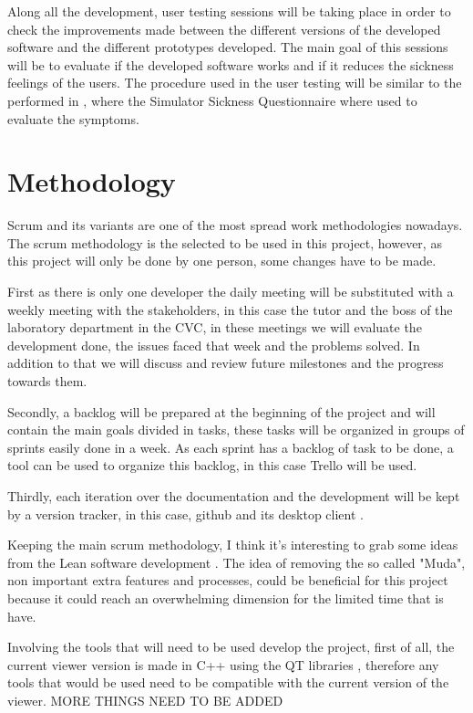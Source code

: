 \documentclass[10pt,a4paper,twocolumn,twoside]{article}
\begin{document}
Along all the development, user testing sessions will be taking place in order to check the improvements made between the different versions of the developed software and the different prototypes developed. The main goal of this sessions will be to evaluate if the developed software works and if it reduces the sickness feelings of the users. The procedure used in the user testing will be similar to the performed in \cite{ifftConfortDoF}, where the Simulator Sickness Questionnaire \cite{ssqQuestion} where used to evaluate the symptoms. 

\section{Methodology}
Scrum and its variants are one of the most spread work methodologies nowadays.
The scrum methodology is the selected to be used in this project, however, as this project will only be done by one person, some changes have to be made. 

First as there is only one developer the daily meeting will be substituted with a weekly meeting with the stakeholders, in this case the tutor and the boss of the laboratory department in the CVC, in these meetings we will evaluate the development done, the issues faced that week and the problems solved. In addition to that we will discuss and review future milestones and the progress towards them.

Secondly, a backlog will be prepared at the beginning of the project and will contain the main goals divided in tasks, these tasks will be organized in groups of sprints easily done in a week. As each sprint has a backlog of task to be done, a tool can be used to organize this backlog, in this case Trello\cite{web:trello} will be used.

Thirdly, each iteration over the documentation and the development will be kept by a version tracker, in this case, github \cite{web:github} and its desktop client \cite{web:githubDesktop}. 

Keeping the main scrum methodology, I think it's interesting to grab some ideas from the Lean software development \cite{web:leanMethod}. The idea of removing the so called "Muda", non important extra features and processes, could be beneficial for this project because it could reach an overwhelming dimension for the limited time that is have.


Involving the tools that will need to be used develop the project, first of all, the current viewer version is made in C++ using the QT libraries \cite{web:qt}, therefore any tools that would be used need to be compatible with the current version of the viewer. MORE THINGS NEED TO BE ADDED
\end{document}
